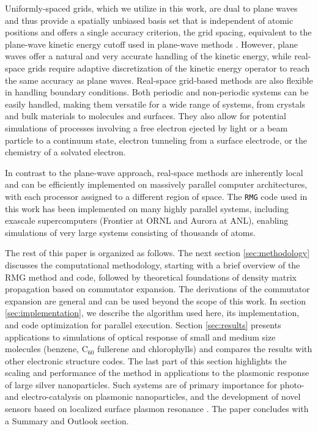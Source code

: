 \documentclass[journal=jctcce,manuscript=article,etalmode=truncate,maxauthors=10,layout=twocolumn,9pt]{achemso}   %
\begin{document}
Uniformly-spaced grids, which we utilize in this work, are dual to plane waves and thus provide a spatially unbiased basis set that is independent of atomic positions and offers a single accuracy criterion, the grid spacing, equivalent to the plane-wave kinetic energy cutoff used in plane-wave methods \cite{rmg-dft-2024}. However, plane waves offer a natural and very accurate handling of the kinetic energy, while real-space grids require adaptive discretization of the kinetic energy operator to reach the same accuracy as plane waves.\cite{rmg-dft-2024} Real-space grid-based methods are also flexible in handling boundary conditions.  Both periodic and non-periodic systems can be easily handled, making them versatile for a wide range of systems, from crystals and bulk materials to molecules and surfaces. 
They also allow for potential simulations of processes involving a free electron ejected by light or a beam particle to a continuum state, electron tunneling from a surface electrode, or the chemistry of a solvated electron.

In contrast to the plane-wave approach, real-space methods
are inherently local and can be efficiently implemented on massively parallel computer architectures,
with each processor assigned to a different region of space.
The \texttt{RMG} code used in this work has been implemented on many highly parallel systems, including exascale supercomputers (Frontier at ORNL and Aurora at ANL), enabling simulations of very large systems consisting of thousands of atoms.  


The rest of this paper is organized as follows.  
The next section \ref{sec:methodology} discusses the  computational  methodology, starting  
with  a brief overview of the RMG method and code, followed  by theoretical  foundations 
of density matrix propagation based  on commutator expansion. The derivations of the commutator expansion  are general 
and can be used beyond the scope of this work.
In section \ref{sec:implementation}, we describe the algorithm used here, its implementation, and code optimization for parallel execution.
Section \ref{sec:results} presents  applications to simulations of optical response of  small  and medium  size  molecules 
(benzene, C$_{60}$ fullerene and chlorophylls) and compares the results with other electronic structure codes. The last part of this section  highlights  the scaling and performance of  the method in  applications
to the plasmonic response of large  silver nanoparticles.
Such systems are  of primary importance  for  photo- and electro-catalysis on plasmonic  nanoparticles, 
and  the development of novel sensors based on  localized surface plasmon resonance \cite{CO2-AuNP,LSPR-review}.
The paper concludes with  a Summary and Outlook section.
\end{document}
